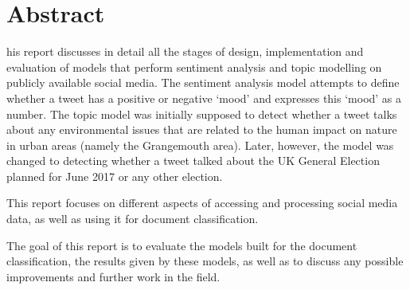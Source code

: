 
\chapter*{Abstract}
\begin{SingleSpace}

his report discusses in detail all the stages of design, implementation and evaluation of models that perform sentiment analysis and topic modelling on publicly available social media. The sentiment analysis model attempts to define whether a tweet has a positive or negative `mood' and expresses this `mood' as a number. The topic model was initially supposed to detect whether a tweet talks about any environmental issues that are related to the human impact on nature in urban areas (namely the Grangemouth area). Later, however, the model was changed to detecting whether a tweet talked about the UK General Election planned for June 2017 or any other election. 

This report focuses on different aspects of accessing and processing social media data, as well as using it for document classification.

The goal of this report is to evaluate the models built for the document classification, the results given by these models, as well as to discuss any possible improvements and further work in the field.
\end{SingleSpace}